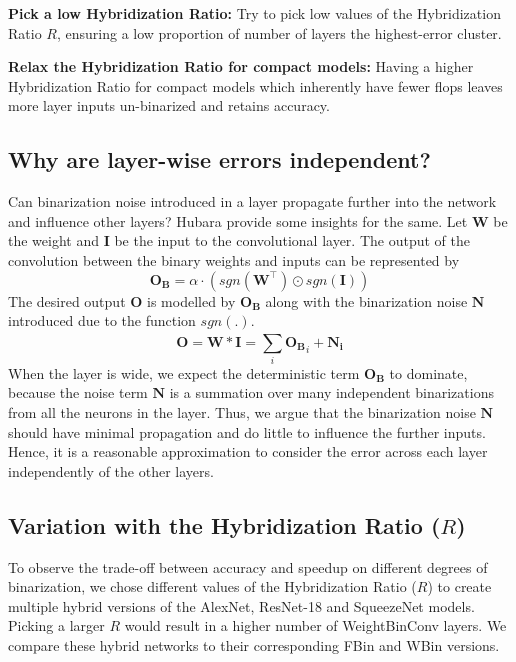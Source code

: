 \documentclass[10pt,twocolumn,letterpaper]{article}
\begin{document}
{\bf Pick a low Hybridization Ratio:} Try to pick low values of the Hybridization Ratio $R$, ensuring a low proportion of number of layers the highest-error cluster.

{\bf Relax the Hybridization Ratio for compact models:} Having a higher Hybridization Ratio for compact models which inherently have fewer flops leaves more layer inputs un-binarized and retains accuracy. 

\subsection{Why are layer-wise errors independent?}
Can binarization noise introduced in a layer propagate further into the network and influence other layers? Hubara \etal \cite{hubara2016quantized} provide some insights for the same. Let $\mathbf{W}$ be the weight and $\mathbf{I}$ be the input to the convolutional layer. The output of the convolution between the binary weights and inputs can be represented by \begin{equation}\mathbf{O_B} = \alpha \cdot (sgn(\mathbf{W}^\intercal) \odot sgn(\mathbf{I}))\end{equation} The desired output $\mathbf{O}$ is modelled by $\mathbf{O_B}$ along with the binarization noise $\mathbf{N}$ introduced due to the function $sgn(.)$. \begin{equation}\mathbf{O} = \mathbf{W} * \mathbf{I} = \sum_{i}^{} \mathbf{O_B}_i + \mathbf{N_i}\end{equation} When the layer is wide, we expect the deterministic term $\mathbf{O_B}$ to dominate, because the noise term $\mathbf{N}$ is a summation over many independent binarizations from all the neurons in the layer. Thus, we argue that the binarization noise $\mathbf{N}$ should have minimal propagation and do little to influence the further inputs. Hence, it is a reasonable approximation to consider the error across each layer independently of the other layers.

\subsection{Variation with the Hybridization Ratio ($R$)}
To observe the trade-off between accuracy and speedup on different degrees of binarization, we chose different values of the Hybridization Ratio ($R$) to create multiple hybrid versions of the AlexNet, ResNet-18 and SqueezeNet models. Picking a larger $R$ would result in a higher number of WeightBinConv layers. We compare these hybrid networks to their corresponding FBin and WBin versions. 
\end{document}
